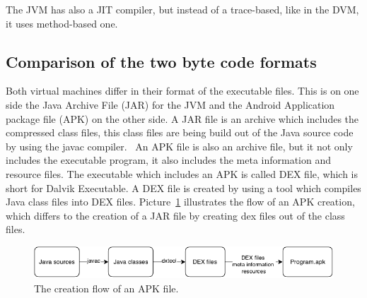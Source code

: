 The JVM has also a JIT compiler, but instead of a trace-based, like in the DVM, it uses method-based one.~\cite{kotzmann2008design}



\subsection{Comparison of the two byte code formats}
\label{sec:comparison-of-the-two-bytecode-formats}
Both virtual machines differ in their format of the executable files.
This is on one side the Java Archive File (JAR) for the JVM and the Android Application package file (APK) on the other side.
A JAR file is an archive which includes the compressed class files, this class files are being build out of the Java source code by using the javac compiler.~\cite{pugh1999compressing} 
An APK file is also an archive file, but it not only includes the executable program, it also includes the meta information and resource files.
The executable which includes an APK is called DEX file, which is short for Dalvik Executable.
A DEX file is created by using a tool which compiles Java class files into DEX files.
Picture~\ref{fig:create-apk} illustrates the flow of an APK creation, which differs to the creation of a JAR file by creating dex files out of the class files.\\
\begin{figure}[h]
\begin{center}
\includegraphics[scale=0.55]{images/create-apk.png} 
\caption{The creation flow of an APK file.}
\label{fig:create-apk}
\end{center}
\end{figure}

